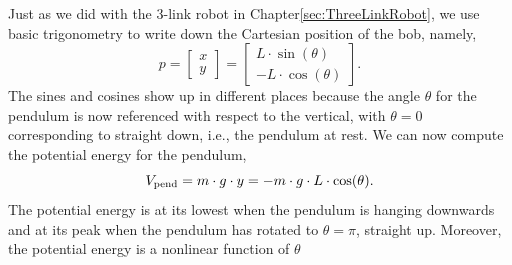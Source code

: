Just as we did with the 3-link robot in Chapter\ref{sec:ThreeLinkRobot}, we use basic trigonometry to write down the Cartesian position of the bob, namely,
\begin{equation}
\label{eq:PendulumPosition}
    p = \left[\begin{array}{r} x \\ y \end{array}\right] = \left[\begin{array}{c} L \cdot \sin(\theta) \\ - L \cdot \cos(\theta)\end{array}\right].
\end{equation}
The sines and cosines show up in different places because the angle $\theta$ for the pendulum is now referenced with respect to the vertical, with $\theta = 0$ corresponding to straight down, i.e., the pendulum at rest. We can now compute the potential energy for the pendulum,
\begin{equation}
    V_{\rm pend} = m \cdot g \cdot y =  - m \cdot g \cdot L \cdot \cos(\theta).
\end{equation}
The potential energy is at its lowest when the pendulum is hanging downwards and at its peak when the pendulum has rotated to $\theta = \pi$, straight up. Moreover, the potential energy is a nonlinear function of $\theta$

